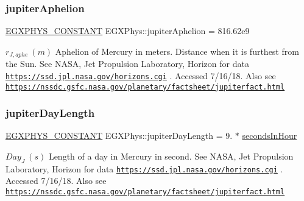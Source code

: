 \subsubsection{\texorpdfstring{jupiter\+Aphelion}{jupiterAphelion}}
{\footnotesize\ttfamily \mbox{\hyperlink{group___e_g_x_phys-_constants-_macros_ga76980d288494ce1714c9ac68a95ba702}{E\+G\+X\+P\+H\+Y\+S\+\_\+\+C\+O\+N\+S\+T\+A\+NT}} E\+G\+X\+Phys\+::jupiter\+Aphelion = 816.\+62e9}

$ r_{J,aphe} \ (m)$ Aphelion of Mercury in meters. Distance when it is furthest from the Sun. See N\+A\+SA, Jet Propulsion Laboratory, Horizon for data \href{https://ssd.jpl.nasa.gov/horizons.cgi}{\tt https\+://ssd.\+jpl.\+nasa.\+gov/horizons.\+cgi} . Accessed 7/16/18. Also see \href{https://nssdc.gsfc.nasa.gov/planetary/factsheet/jupiterfact.html}{\tt https\+://nssdc.\+gsfc.\+nasa.\+gov/planetary/factsheet/jupiterfact.\+html} \mbox{\label{group___e_g_x_phys-_constants-_astrophysics-_solar_system-_mercury-_orbit_ga9f7093c7f773b93f4155fb35a0d36665}} 
\subsubsection{\texorpdfstring{jupiter\+Day\+Length}{jupiterDayLength}}
{\footnotesize\ttfamily \mbox{\hyperlink{group___e_g_x_phys-_constants-_macros_ga76980d288494ce1714c9ac68a95ba702}{E\+G\+X\+P\+H\+Y\+S\+\_\+\+C\+O\+N\+S\+T\+A\+NT}} E\+G\+X\+Phys\+::jupiter\+Day\+Length = 9. $\ast$ \mbox{\hyperlink{namespace_e_g_x_phys_a7c3165cd93e36f1fb8e9fef80f117bef}{seconds\+In\+Hour}}}

$ Day_{J} \ (s)$ Length of a day in Mercury in second. See N\+A\+SA, Jet Propulsion Laboratory, Horizon for data \href{https://ssd.jpl.nasa.gov/horizons.cgi}{\tt https\+://ssd.\+jpl.\+nasa.\+gov/horizons.\+cgi} . Accessed 7/16/18. Also see \href{https://nssdc.gsfc.nasa.gov/planetary/factsheet/jupiterfact.html}{\tt https\+://nssdc.\+gsfc.\+nasa.\+gov/planetary/factsheet/jupiterfact.\+html} \mbox{\label{group___e_g_x_phys-_constants-_astrophysics-_solar_system-_mercury-_orbit_ga9d8885ca3f314c675788ceec89e3a933}} 

